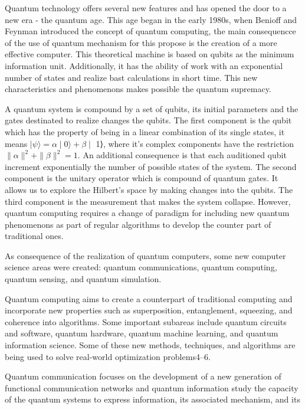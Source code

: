 \documentclass[12pt]{article}
\begin{document}
	{Quantum technology offers several new features and has opened the door to a new era - the quantum age. This age began in the early 1980s, when Benioff and Feynman introduced the concept of quantum computing, the main consequencce of the use of quantum mechanism for this propose is the creation of a more effective computer. This theoretical machine is based on qubits as the minimum information unit. Additionally, it has the ability of work with an exponential number of states and realize bast calculations in short time. This new characteristics and phenomenons makes possible the quantum supremacy\cite{a1,a2,a3}.\par
	A quantum system is compound by a set of qubits, its initial parameters and the gates destinated to realize changes the qubits. The first component is the qubit which has the property of being in a linear combination of its single states, it means $\mid \psi⟩ = \alpha \mid 0⟩+\beta \mid$ 1⟩, where it’s complex components have the restriction $\parallel \alpha \parallel^2 +\parallel \beta \parallel^2 = 1$. An additional consequence is that
	each auditioned qubit increment exponentially the number of possible states of the system. The second component is the unitary
	operator which is compound of quantum gates. It allows us to explore the Hilbert’s space by making changes into the qubits.
	The third component is the measurement that makes the system collapse. However, quantum computing requires a change of
	paradigm for including new quantum phenomenons as part of regular algorithms to develop the counter part of traditional ones.\par
	As consequence of the realization of quantum computers, some new computer science areas were created: quantum
	communications, quantum computing, quantum sensing, and quantum simulation.\par
	Quantum computing aims to create a counterpart of traditional computing and incorporate new properties such as superposition, entanglement, squeezing, and coherence into algorithms. Some important subareas include quantum circuits and software\cite{a4,a5,a6},
	quantum hardware, quantum machine learning, and quantum information science. Some of these new methods, techniques, and
	algorithms are being used to solve real-world optimization problems4–6.\par
	Quantum communication focuses on the development of a new generation of functional communication networks and
	quantum information study the capacity of the quantum systems to express information, its associated mechanism, and its
}
\end{document}
